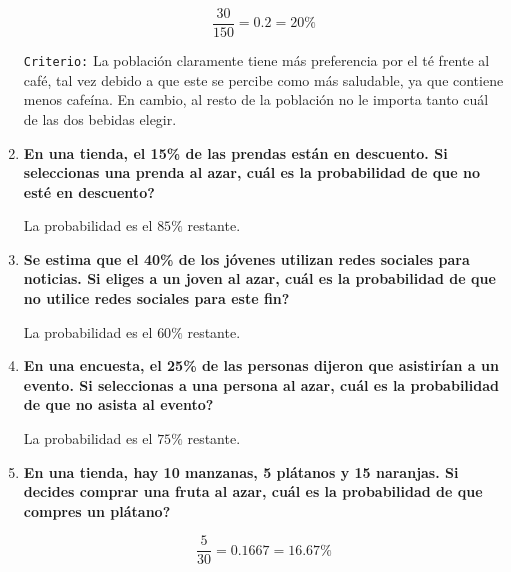 \documentclass[12pt]{article}
\begin{document}
\begin{enumerate}[label=\textbf{\arabic*.}]
                         \[\frac{30}{150} = 0.2 = 20\%\]

                         \texttt{Criterio:} La población claramente tiene más preferencia por el té frente al café, tal vez 
                                            debido a que este se percibe como más saludable, ya que contiene menos cafeína. 
                                            En cambio, al resto de la población no le importa tanto cuál de las dos bebidas elegir.
        
        \item \textbf{En una tienda, el 15\% de las prendas están en descuento. Si seleccionas
                        una prenda al azar, \textquestiondown cuál es la probabilidad de que no esté en descuento?}

                        La probabilidad es el $85\%$ restante.
        
        \item \textbf{Se estima que el 40\% de los jóvenes utilizan redes sociales para noticias. Si
                        eliges a un joven al azar, \textquestiondown  cuál es la probabilidad de que no utilice redes
                        sociales para este fin?}

                        La probabilidad es el $60\%$ restante.
        
        \item \textbf{En una encuesta, el 25\% de las personas dijeron que asistirían a un evento.
                        Si seleccionas a una persona al azar, \textquestiondown  cuál es la probabilidad de que no
                        asista al evento?}

                        La probabilidad es el $75\%$ restante.
        
        \item \textbf{En una tienda, hay 10 manzanas, 5 plátanos y 15 naranjas. Si decides
                        comprar una fruta al azar, \textquestiondown cuál es la probabilidad de que compres un
                        plátano?}

                        \[\frac{5}{30} = 0.1667 = 16.67\%\]
        

\end{enumerate}
\end{document}
